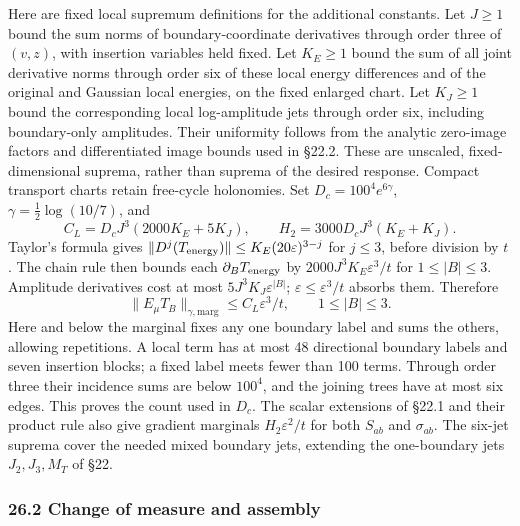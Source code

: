 \documentclass[11pt,a4paper]{article}
\begin{document}
Here are fixed local supremum definitions for the additional constants.
Let \(J\ge1\) bound the sum norms of boundary-coordinate derivatives
through order three of \((v,z)\), with insertion variables held fixed.
Let \(K_E\ge1\) bound the sum of all joint derivative norms through
order six of these local energy differences and of the original and
Gaussian local energies, on the fixed enlarged chart. Let \(K_J\ge1\)
bound the corresponding local log-amplitude jets through order six,
including boundary-only amplitudes. Their uniformity follows from the
analytic zero-image factors and differentiated image bounds used in
§22.2. These are unscaled, fixed-dimensional suprema, rather than
suprema of the desired response. Compact transport charts retain
free-cycle holonomies. Set \(D_c=100^4e^{6\gamma}\),
\(\gamma=\frac12\log(10/7)\), and \[C_L=D_cJ^3(2000K_E+5K_J),\qquad
H_2=3000D_cJ^3(K_E+K_J).\] Taylor's formula gives
\(\|D^j(T_{\rm energy})\|\le K_E(20\varepsilon)^{3-j}\) for \(j\le3\),
before division by \(t\). The chain rule then bounds each
\(\partial_BT_{\rm energy}\) by \(2000J^3K_E\varepsilon^3/t\) for
\(1\le|B|\le3\). Amplitude derivatives cost at most
\(5J^3K_J\varepsilon^{|B|}\); \(\varepsilon\le\varepsilon^3/t\) absorbs
them. Therefore
\[\|E_\mu T_B\|_{\gamma,\mathrm{marg}}\le C_L\varepsilon^3/t,
\qquad 1\le |B|\le3.\tag{117}\] Here and below the marginal fixes any
one boundary label and sums the others, allowing repetitions. A local
term has at most 48 directional boundary labels and seven insertion
blocks; a fixed label meets fewer than 100 terms. Through order three
their incidence sums are below \(100^4\), and the joining trees have at
most six edges. This proves the count used in \(D_c\). The scalar
extensions of §22.1 and their product rule also give gradient marginals
\(H_2\varepsilon^2/t\) for both \(S_{ab}\) and \(\sigma_{ab}\). The
six-jet suprema cover the needed mixed boundary jets, extending the
one-boundary jets \(J_2,J_3,M_T\) of §22.

\hypertarget{change-of-measure-and-assembly}{%
\subsubsection{26.2 Change of measure and
assembly}\label{change-of-measure-and-assembly}}
\end{document}
